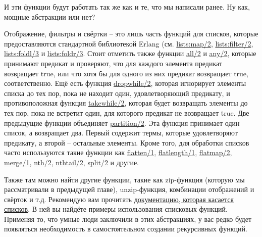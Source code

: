 \documentclass[a4paper,12pt]{report}
\newcommand{\ops}{\colorbox{lgreen}}
\begin{document}
И эти функции будут работать так же как и те, что мы написали ранее. Ну как, мощные абстракции или нет?

Отображение, фильтры и свёртки \--- это лишь часть функций для списков, которые предоставляются стандартной библиотекой Erlang (см. \ops{\href{http://erldocs.com/R15B/stdlib/lists.html\#map/2}{lists:map/2}}, \ops{\href{http://erldocs.com/R15B/stdlib/lists.html\#filter/2}{lists:filter/2}}, \ops{\href{http://erldocs.com/R15B/stdlib/lists.html\#foldl/3}{lists:foldl/3}} и \ops{\href{http://erldocs.com/R15B/stdlib/lists.html\#foldr/3}{lists:foldr/3}}. Стоит отметить также функции \ops{\href{http://erldocs.com/R15B/stdlib/lists.html\#all/2}{all/2}} и \ops{\href{http://erldocs.com/R15B/stdlib/lists.html\#any/2}{any/2}}, которые принимают предикат и проверяют, что для каждого элемента предикат возвращает true, или что хотя бы для одного из них предикат возвращает true, соответственно. Ещё есть функция \ops{\href{http://erldocs.com/R15B/stdlib/lists.html\#dropwhile/2}{dropwhile/2}}, которая игнорирует элементы списка до тех пор, пока не находит один, удовлетворяющий предикату, и противоположная функция \ops{\href{http://erldocs.com/R15B/stdlib/lists.html\#takewhile/2}{takewhile/2}}, которая будет возвращать элементы до тех пор, пока не встретит один, для которого предикат не возвращает true. Две предыдущие функции объединяет \ops{\href{http://erldocs.com/R15B/stdlib/lists.html\#partition/2}{partition/2}}. Эта функция принимает один список, а возвращает два. Первый содержит термы, которые удовлетворяют предикату, а второй \--- остальные элементы. Кроме того, для обработки списков часто используются такие функции как \ops{\href{http://erldocs.com/R15B/stdlib/lists.html\#flatten/1}{flatten/1}}, \ops{\href{http://erldocs.com/R15B/stdlib/lists.html\#flatlength/1}{flatlength/1}}, \ops{\href{http://erldocs.com/R15B/stdlib/lists.html\#flatmap/2}{flatmap/2}}, \ops{\href{http://erldocs.com/R15B/stdlib/lists.html\#merge/1}{merge/1}}, \ops{\href{http://erldocs.com/R15B/stdlib/lists.html\#nth/2}{nth/2}}, \ops{\href{http://erldocs.com/R15B/stdlib/lists.html\#nthtail/2}{nthtail/2}}, \ops{\href{http://erldocs.com/R15B/stdlib/lists.html\#split/2}{split/2}} и другие.

Также там можно найти другие функции, такие как zip\--функция (которую мы рассматривали в предыдущей главе), unzip\--функция, комбинации отображений и свёрток и т.д. Рекомендую вам прочитать \href{http://erldocs.com/R15B/stdlib/lists.html}{документацию, которая касается списков}. В ней вы найдёте примеры использования списковых функций. Применяя то, что умные люди заключили в этих абстракциях, у вас редко будет появляться необходимость в самостоятельном создании рекурсивных функций.
\end{document}
